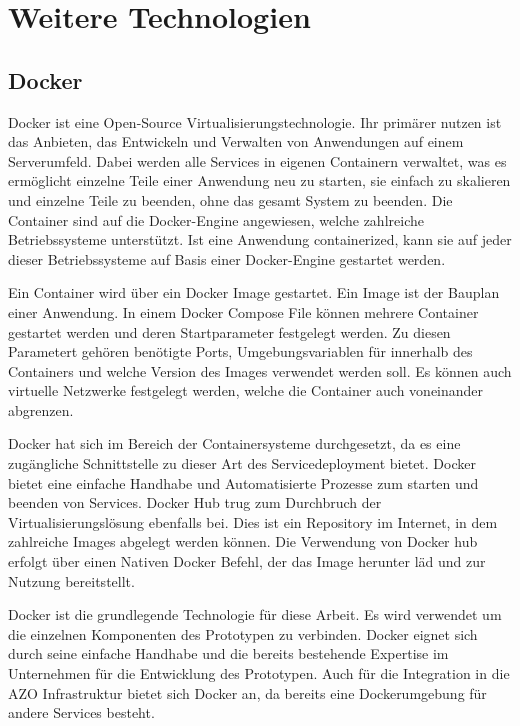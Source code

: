 \documentclass[a4paper, 12pt, oneside, toc=listofnumbered, bibliography=totoc]{scrbook}
\begin{document}
	\section{Weitere Technologien}
		\subsection{Docker}
		
		Docker ist eine Open-Source Virtualisierungstechnologie. Ihr primärer nutzen ist das Anbieten, das Entwickeln und Verwalten von Anwendungen auf einem Serverumfeld. Dabei werden alle Services in eigenen Containern verwaltet, was es ermöglicht einzelne Teile einer Anwendung neu zu starten, sie einfach zu skalieren und einzelne Teile zu beenden, ohne das gesamt System zu beenden. Die Container sind auf die Docker-Engine angewiesen, welche zahlreiche Betriebssysteme unterstützt. Ist eine Anwendung containerized, kann sie auf jeder dieser Betriebssysteme auf Basis einer Docker-Engine gestartet werden. \cite{noauthor_install_2023}
		
		Ein Container wird über ein Docker Image gestartet. Ein Image ist der Bauplan einer Anwendung. In einem Docker Compose File können mehrere Container gestartet werden und deren Startparameter festgelegt werden. Zu diesen Parametert gehören benötigte Ports, Umgebungsvariablen für innerhalb des Containers und welche Version des Images verwendet werden soll. Es können auch virtuelle Netzwerke festgelegt werden, welche die Container auch voneinander abgrenzen. 
		
		Docker hat sich im Bereich der Containersysteme durchgesetzt, da es eine zugängliche Schnittstelle zu dieser Art des Servicedeployment bietet. Docker bietet eine einfache Handhabe und Automatisierte Prozesse zum starten und beenden von Services. Docker Hub trug zum Durchbruch der Virtualisierungslösung ebenfalls bei. Dies ist ein Repository im Internet, in dem zahlreiche Images abgelegt werden können. Die Verwendung von Docker hub erfolgt über einen Nativen Docker Befehl, der das Image herunter läd und zur Nutzung bereitstellt. 
		
		Docker ist die grundlegende Technologie für diese Arbeit. Es wird verwendet um die einzelnen Komponenten des Prototypen zu verbinden. Docker eignet sich durch seine einfache Handhabe und die bereits bestehende Expertise im Unternehmen für die Entwicklung des Prototypen. Auch für die Integration in die AZO Infrastruktur bietet sich Docker an, da bereits eine Dockerumgebung für andere Services besteht. 
		
\end{document}
